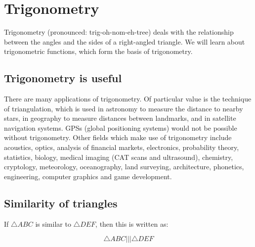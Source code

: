 \chapter{Trigonometry}
\setcounter{figure}{1}
\setcounter{subfigure}{1}

Trigonometry (pronounced: trig-oh-nom-eh-tree) deals with the relationship between the angles and the sides of a right-angled triangle. We will learn about trigonometric functions, which form the basis of trigonometry.\par 

\section{Trigonometry is useful}
\nopagebreak
There are many applications of trigonometry. Of particular value is the technique of triangulation, which is used in astronomy to measure the distance to nearby stars, in geography to measure distances between landmarks, and in satellite navigation systems. GPSs (global positioning systems) would not be possible without trigonometry. Other fields which make use of trigonometry include acoustics, optics, analysis of financial markets, electronics, probability theory, statistics, biology, medical imaging (CAT scans and ultrasound), chemistry, cryptology, meteorology, oceanography, land surveying, architecture, phonetics, engineering, computer graphics and game development.\par 

\section{Similarity of triangles}
\nopagebreak
If $\triangle ABC$ is similar to $ \triangle DEF$, then this is written as:\par 

\begin{equation*}
\triangle ABC||| \triangle DEF
\end{equation*}


